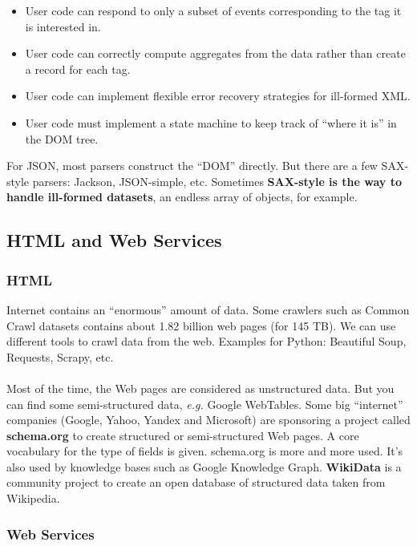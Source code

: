 \begin{itemize}
\renewcommand{\labelitemi}{{\bf +}}
 \item User code can respond to only a subset of events corresponding to the tag it is interested in.
 \item User code can correctly compute aggregates from the data rather than create a record for each tag.
 \item User code can implement flexible error recovery strategies for ill-formed XML.
\renewcommand{\labelitemi}{{\bf --}}
 \item User code must implement a state machine to keep track of ``where it is'' in the DOM tree.
\end{itemize}

For JSON, most parsers construct the ``DOM'' directly. But there are a few SAX-style parsers: Jackson, JSON-simple, etc. Sometimes {\bf SAX-style is the way to handle ill-formed datasets}, an endless array of objects, for example.

\subsection{HTML and Web Services}

\subsubsection{HTML}

Internet contains an ``enormous'' amount of data. Some crawlers such as Common Crawl datasets contains about 1.82 billion web pages (for 145 TB). We can use different tools to crawl data from the web. Examples for Python: Beautiful Soup, Requests, Scrapy, etc. 
\\\\
Most of the time, the Web pages are considered as unstructured data. But you can find some semi-structured data, {\it e.g.} Google WebTables. Some big ``internet'' companies (Google, Yahoo, Yandex and Microsoft) are sponsoring a project called {\bf schema.org} to create structured or semi-structured Web pages. A core vocabulary for the type of fields is given. schema.org is more and more used. It's also used by knowledge bases such as Google Knowledge Graph. {\bf WikiData} is a community project to create an open database of structured data taken from Wikipedia.

\subsubsection{Web Services}

